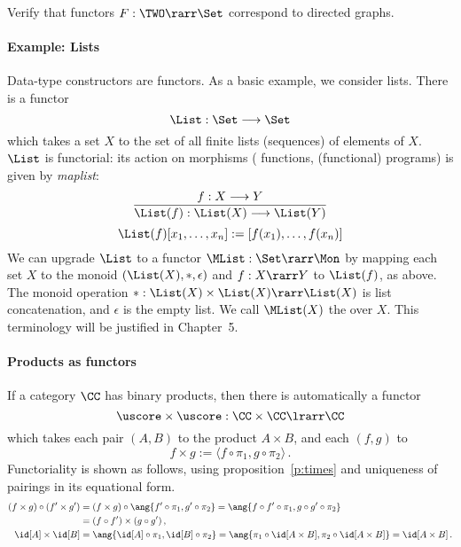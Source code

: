 \documentclass{svmult}
\begin{document}
\begin{myexercise}
Verify that functors $F:\TWO\rarr\Set$ correspond to {directed graphs}.
\end{myexercise}

\paragraph{Example: Lists}

Data-type constructors are functors. As a basic example, we consider
lists. There is a functor
\[ \List : \Set \longrightarrow \Set \]
which takes a set $X$ to the set of all finite lists (sequences) of
elements of $X$. $\List$ is functorial: its action on morphisms (\ie
functions, \ie (functional) programs) is given by \emph{maplist}:
\[ \frac{f : X \longrightarrow Y}{\List (f) : \List (X)
  \longrightarrow \List (Y)} \]
\[ \List (f) [ x_1 , \ldots , x_n ] := [ f(x_1 ), \ldots , f(x_n )] \]
We can upgrade $\List$ to a functor $\MList:\Set\rarr\Mon$ by mapping each set $X$ to the monoid $(\List(X),*,\epsilon)$ and $f:X\rarr Y$ to
$\List(f)$, as above. The monoid operation $*:\List(X)\times\List(X)\rarr\List(X)$ is list concatenation, and $\epsilon$ is the empty list. We call
$\MList(X)$ the  over $X$. This terminology will be justified in Chapter~5.

\paragraph{Products as functors} If a category $\CC$ has binary products, then there is automatically a functor
\[ \uscore\times\uscore : \CC \times \CC \lrarr \CC \]
which takes each pair $(A,B)$ to the product $A\times B$, and each $(f, g)$ to
\[ f \times g := \langle f \circ \pi_1 , g \circ \pi_2 \rangle\,. \]
Functoriality is shown as follows, using proposition~\ref{p:times} and uniqueness of pairings in its equational form.
\begin{align*}
  (f\times g)\circ(f'\times g') &= (f\times g)\circ\ang{f'\circ\pi_1,g'\circ\pi_2}=\ang{f\circ f'\circ\pi_1,g\circ g'\circ\pi_2} \\
    &= (f\circ f')\times(g\circ g')\,,\\
  \id[A]\times\id[B] &= \ang{\id[A]\circ\pi_1,\id[B]\circ\pi_2} = \ang{\pi_1\circ\id[A\times B],\pi_2\circ\id[A\times B]} = \id[A\times B]\,.
\end{align*}
\end{document}
